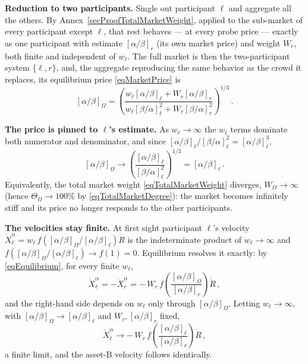 \documentclass[letterpaper]{article}
\newcommand{\priceAB}{\left[\alpha / \beta\right]}
\newcommand{\priceBA}{\left[\beta / \alpha\right]}
\begin{document}
\textbf{Reduction to two participants.} Single out participant $\ell$ and aggregate all the others. By Annex~\ref{secProofTotalMarketWeight}, applied to the sub-market of every participant except $\ell$, that rest behaves --- at every probe price --- exactly as one participant with estimate $\priceAB_r$ (its own market price) and weight $W_r$, both finite and independent of $w_\ell$. The full market is then the two-participant system $\{\ell, r\}$, and, the aggregate reproducing the same behavior as the crowd it replaces, its equilibrium price \eqref{eqMarketPrice} is
\begin{equation*}
    \priceAB_\Omega = \left( \frac{w_\ell \priceAB_\ell + W_r \priceAB_r}{w_\ell \priceBA_\ell^2 + W_r \priceBA_r^2} \right)^{1/3} \,.
\end{equation*}

\textbf{The price is pinned to $\ell$'s estimate.} As $w_\ell \to \infty$ the $w_\ell$ terms dominate both numerator and denominator, and since $\priceAB_\ell / \priceBA_\ell^2 = \priceAB_\ell^3$,
\begin{equation*}
    \priceAB_\Omega \longrightarrow \left( \frac{\priceAB_\ell}{\priceBA_\ell^2} \right)^{1/3} = \priceAB_\ell \,.
\end{equation*}
Equivalently, the total market weight \eqref{eqTotalMarketWeight} diverges, $W_\Omega \to \infty$ (hence $\Theta_\Omega \to 100\%$ by \eqref{eqTotalMarketDegree}): the market becomes infinitely stiff and its price no longer responds to the other participants.

\textbf{The velocities stay finite.} At first sight participant $\ell$'s velocity $\dot{X}_\ell^\alpha = w_\ell\, f\!\left(\priceAB_\Omega / \priceAB_\ell\right) \dot{R}$ is the indeterminate product of $w_\ell \to \infty$ and $f\!\left(\priceAB_\Omega / \priceAB_\ell\right) \to f(1) = 0$. Equilibrium resolves it exactly: by \eqref{eqEquilibrium}, for every finite $w_\ell$,
\begin{equation*}
    \dot{X}_\ell^\alpha = -\dot{X}_r^\alpha = -\,W_r\, f\!\left( \frac{\priceAB_\Omega}{\priceAB_r} \right) \dot{R} \,,
\end{equation*}
and the right-hand side depends on $w_\ell$ only through $\priceAB_\Omega$. Letting $w_\ell \to \infty$, with $\priceAB_\Omega \to \priceAB_\ell$ and $W_r, \priceAB_r$ fixed,
\begin{equation*}
    \dot{X}_\ell^\alpha \longrightarrow -\,W_r\, f\!\left( \frac{\priceAB_\ell}{\priceAB_r} \right) \dot{R} \,,
\end{equation*}
a finite limit, and the asset-B velocity follows identically.
\end{document}
